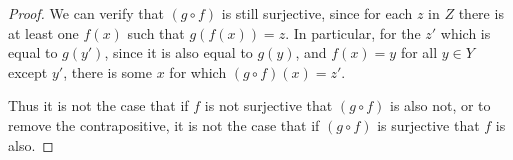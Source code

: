 \documentclass[../../main.tex]{subfiles}
\begin{document}
\begin{enumerate}
\begin{proof}
    We can verify that $(g \circ f)$ is still surjective, since for each $z$ in $Z$ there is at least one $f(x)$ such that $g(f(x))=z$.
    In particular, for the $z'$ which is equal to $g(y')$, since it is also equal to $g(y)$, and $f(x)=y$ for all $y \in Y$ except $y'$, there is some $x$ for which $(g \circ f)(x)=z'$.

    Thus it is not the case that if $f$ is not surjective that $(g \circ f)$ is also not, or to remove the contrapositive, it is not the case that if $(g \circ f)$ is surjective that $f$ is also.
\end{proof}
\end{enumerate}

\addtocounter{subsection}{2}
\subsection{}\label{inclusionmap}
\end{document}
